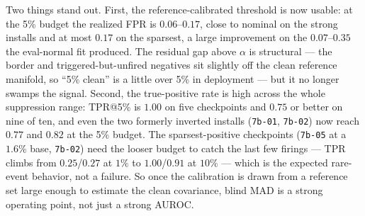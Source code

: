 \documentclass[11pt]{article}
\begin{document}
Two things stand out. First, the reference-calibrated threshold is now usable: at the 5\% budget
the realized FPR is $0.06$--$0.17$, close to nominal on the strong installs and at most $0.17$ on
the sparsest, a large improvement on the $0.07$--$0.35$ the eval-normal fit produced. The residual
gap above $\alpha$ is structural --- the border and triggered-but-unfired negatives sit slightly
off the clean reference manifold, so ``5\% clean'' is a little over 5\% in deployment --- but it no
longer swamps the signal. Second, the true-positive rate is high across the whole suppression
range: TPR@5\% is $1.00$ on five checkpoints and $0.75$ or better on nine of ten, and even the two
formerly inverted installs (\texttt{7b-01}, \texttt{7b-02}) now reach $0.77$ and $0.82$ at the 5\%
budget. The sparsest-positive checkpoints (\texttt{7b-05} at a $1.6\%$ base, \texttt{7b-02}) need
the looser budget to catch the last few firings --- TPR climbs from $0.25$/$0.27$ at $1\%$ to
$1.00$/$0.91$ at $10\%$ --- which is the expected rare-event behavior, not a failure. So once the
calibration is drawn from a reference set large enough to estimate the clean covariance, blind MAD
is a strong operating point, not just a strong AUROC.
\end{document}
